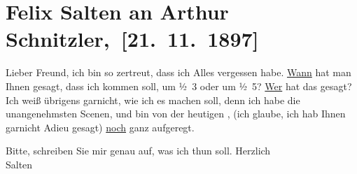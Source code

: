 

\renewcommand{\erwaehnteOrte}{Orte: Wien}
\renewcommand{\erwaehnteWerke}{}
\section[ Felix Salten an Arthur Schnitzler, {[}21. 11. 1897{]}]{Felix Salten an Arthur Schnitzler, {[}21. 11. 1897{]}}
\nopagebreak{}
\rehead{ }\normalsize\beginnumbering{}
\toendnotes[C]{\smallbreak\pagebreak[2]}
\toendnotes[C]{\smallbreak}
\pstart
           \noindent{}{\pb}Lieber Freund, ich bin so zertreut, dass ich Alles vergessen habe.
                  \uline{Wann} hat man Ihnen gesagt, dass ich kommen soll,
               um ½ 3 oder um ½ 5? \uline{Wer} hat
               das gesagt? Ich weiß übrigens garnicht, wie ich es machen soll, denn ich habe die
               unangenehmsten {\pb}Scenen, und bin
               von der heutigen \label{K_L03276-1v}\label{K_L03276-1h}, (ich glaube, ich hab Ihnen garnicht
               Adieu gesagt) \uline{noch} ganz aufgeregt.\pend
           
\pstart
           Bitte, schreiben Sie mir genau auf, was ich thun soll. Herzlich {\\}\spacefill\mbox{Salten}\pend
           \endnumbering{}  
      
